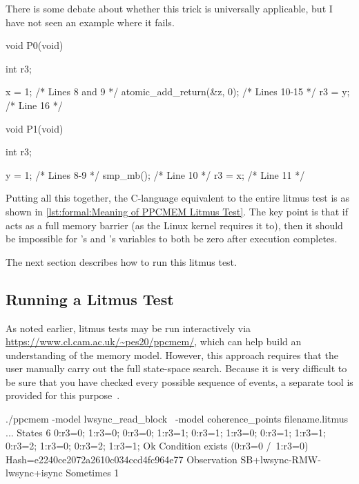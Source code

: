\begin{fcvref}
{	There is some debate about whether this trick is universally
	applicable, but I have not seen an example where it fails.
}\QuickQuizEnd

\begin{listing}[tbp]
\begin{VerbatimL}
void P0(void)
{
	int r3;

	x = 1; /* Lines 8 and 9 */
	atomic_add_return(&z, 0); /* Lines 10-15 */
	r3 = y; /* Line 16 */
}

void P1(void)
{
	int r3;

	y = 1; /* Lines 8-9 */
	smp_mb(); /* Line 10 */
	r3 = x; /* Line 11 */
}
\end{VerbatimL}
\caption{Meaning of PPCMEM Litmus Test}
\label{lst:formal:Meaning of PPCMEM Litmus Test}
\end{listing}

Putting all this together, the C-language equivalent to the entire litmus
test is as shown in
\cref{lst:formal:Meaning of PPCMEM Litmus Test}.
The key point is that if  acts as a full
memory barrier (as the Linux kernel requires it to), 
then it should be impossible for 's and 's 
variables to both be zero after execution completes.

The next section describes how to run this litmus test.

\subsection{Running a Litmus Test}
\label{sec:formal:Running a Litmus Test}

As noted earlier, litmus tests may be run interactively via
\url{https://www.cl.cam.ac.uk/~pes20/ppcmem/}, which can help build an
understanding of the memory model.
However, this approach requires that the user manually carry out the
full state-space search.
Because it is very difficult to be sure that you have checked every
possible sequence of events, a separate tool is provided for this
purpose~\cite{PaulEMcKenney2011ppcmem}.

\begin{listing}[tbp]
\begin{VerbatimL}[numbers=none,xleftmargin=0pt]
./ppcmem -model lwsync_read_block \
         -model coherence_points filename.litmus
...
States 6
0:r3=0; 1:r3=0;
0:r3=0; 1:r3=1;
0:r3=1; 1:r3=0;
0:r3=1; 1:r3=1;
0:r3=2; 1:r3=0;
0:r3=2; 1:r3=1;
Ok
Condition exists (0:r3=0 /\ 1:r3=0)
Hash=e2240ce2072a2610c034ccd4fc964e77
Observation SB+lwsync-RMW-lwsync+isync Sometimes 1
\end{VerbatimL}
\caption{PPCMEM Detects an Error}
\label{lst:formal:PPCMEM Detects an Error}
\end{listing}


\end{fcvref}
